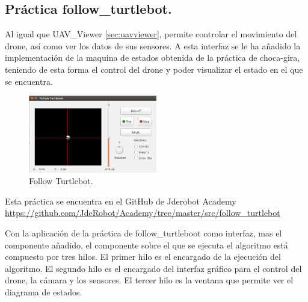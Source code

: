 \subsection{Pr\'actica follow\_turtlebot.}
\hspace{1 cm} Al igual que UAV\_Viewer \ref{sec:uavviewer}, permite controlar el movimiento del drone, as\'i como ver los datos de sus sensores. A esta interfaz se le ha añadido la implementaci\'on de la maquina de estados obtenida de la pr\'actica de choca-gira, teniendo de esta forma el control del drone y poder visualizar el estado en el que se encuentra.


 \begin{figure}[H]
	\centering
		\includegraphics[width=0.5\textwidth]{imgs/follow_turtlebot.png}
		\caption{Follow Turtlebot.}
	\label{fig:FollowTurtlebot}
\end{figure}

\hspace{1 cm}Esta pr\'actica se encuentra en el GitHub de Jderobot Academy \url{https://github.com/JdeRobot/Academy/tree/master/src/follow_turtlebot}

\hspace{1 cm}Con la aplicaci\'on de la pr\'actica de follow\_turtleboot como interfaz, mas el componente añadido, el componente sobre el que se ejecuta el algoritmo est\'a compuesto por tres hilos. El primer hilo es el encargado de la ejecuci\'on del algoritmo. El segundo hilo es el encargado del interfaz gr\'afico para el control del drone, la c\'amara y los sensores. El tercer hilo es la ventana que permite ver el diagrama de estados. 


